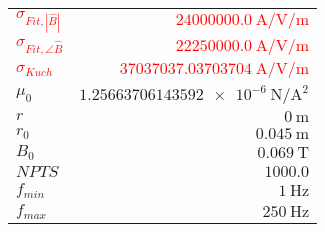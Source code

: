 
{%
    \begin{center}
    \label{tab:fitparams:alu:freq}
    \begin{tabular}{lr}
    \toprule
        \textcolor{red}{$\sigma_{Fit,|\hat{B}|}$} & \textcolor{red}{$\SI{24000000.0}{\ampere\per\volt\per\meter}$}\\
        \textcolor{red}{$\sigma_{Fit,\angle\hat{B}}$} & \textcolor{red}{$\SI{22250000.0}{\ampere\per\volt\per\meter}$}\\
        \textcolor{red}{$\sigma_{Kuch}$} & \textcolor{red}{$\SI{37037037.03703704}{\ampere\per\volt\per\meter}$}\\
        $\mu_0$ & $\SI{1.25663706143592e-6}{\newton\per\ampere\squared}$\\
        $r$ & $\SI{0}{\meter}$\\
        $r_0$ & $\SI{0.045}{\meter}$\\
        $B_0$ & $\SI{0.069}{\tesla}$\\
        $NPTS$ & $\num{1000.0}$\\
        $f_{min}$ & $\SI{1}{\hertz}$\\
        $f_{max}$ & $\SI{250}{\hertz}$\\

    \bottomrule
    \end{tabular}
    \end{center}
}

